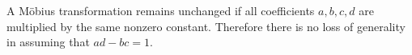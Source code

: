 A Möbius transformation remains unchanged if all coefficients $a, b, c, d$ are multiplied by the same nonzero constant. Therefore there is no loss of generality in assuming that $ad - bc = 1$.
